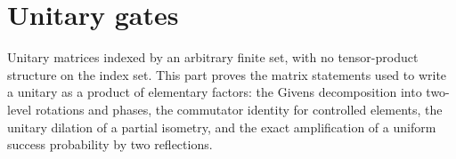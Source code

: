 \part{Unitary gates}
\label{part:unitary_gates}

Unitary matrices indexed by an arbitrary finite set, with no tensor-product
structure on the index set. This part proves the matrix statements used to
write a unitary as a product of elementary factors: the Givens decomposition
into two-level rotations and phases, the commutator identity for controlled
elements, the unitary dilation of a partial isometry, and the exact
amplification of a uniform success probability by two reflections.
